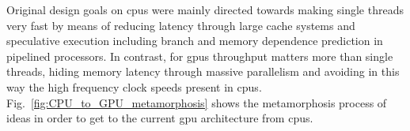 \documentclass[11pt,a4paper]{article}
\begin{document}

Original design goals on \glspl{cpu} were mainly directed towards making single threads very fast by means of reducing latency through large cache systems and speculative execution including branch and memory dependence prediction in pipelined processors. In contrast, for \glspl{gpu} throughput matters more than single threads, hiding memory latency through massive parallelism and avoiding in this way the high frequency clock speeds present in \glspl{cpu}. Fig.~\ref{fig:CPU_to_GPU_metamorphosis} shows the metamorphosis process of ideas in order to get to the current \gls{gpu} architecture from \glspl{cpu}.
\end{document}
